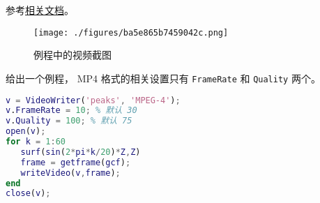 
\begin{issues}
\issueDraft
\end{issues}


参考\href{https://www.mathworks.com/help/matlab/ref/videowriter.html}{相关文档}。

\begin{figure}[ht]
\centering
\texttt{[image: ./figures/ba5e865b7459042c.png]}
\caption{例程中的视频截图} \label{fig_MatMp4_1}
\end{figure}


给出一个例程， MP4 格式的相关设置只有 \verb|FrameRate| 和 \verb|Quality| 两个。
\begin{lstlisting}[language=matlab, caption=mp4\_demo.m]
% 写 mp4 视频
v = VideoWriter('peaks', 'MPEG-4');
v.FrameRate = 10; % 默认 30
v.Quality = 100; % 默认 75
open(v);
for k = 1:60 
   surf(sin(2*pi*k/20)*Z,Z)
   frame = getframe(gcf);
   writeVideo(v,frame);
end
close(v);
\end{lstlisting}
